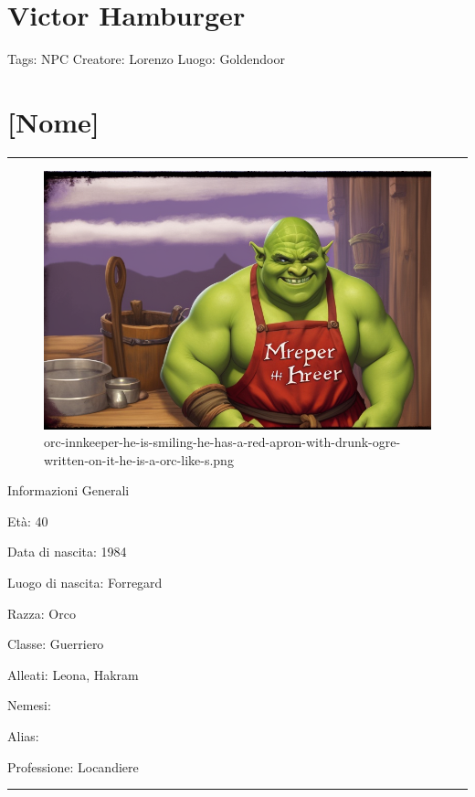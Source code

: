 \section{Victor Hamburger}\label{victor-hamburger}

Tags: NPC Creatore: Lorenzo Luogo: Goldendoor

\section{{[}Nome{]}}\label{nome}

\begin{center}\rule{0.5\linewidth}{0.5pt}\end{center}

\begin{figure}
\centering
\includegraphics{orc-innkeeper-he-is-smiling-he-has-a-red-apron-with-drunk-ogre-written-on-it-he-is-a-orc-like-s.png}
\caption{orc-innkeeper-he-is-smiling-he-has-a-red-apron-with-drunk-ogre-written-on-it-he-is-a-orc-like-s.png}
\end{figure}

Informazioni Generali

Età: 40

Data di nascita: 1984

Luogo di nascita: Forregard

Razza: Orco

Classe: Guerriero

Alleati: Leona, Hakram

Nemesi:

Alias:

Professione: Locandiere

\begin{center}\rule{0.5\linewidth}{0.5pt}\end{center}

